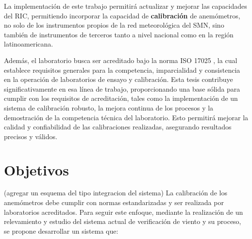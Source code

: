  La implementación de este trabajo permitirá actualizar y mejorar las capacidades del RIC, permitiendo incorporar la capacidad de \textbf{calibración} de anemómetros, no solo de los instrumentos propios de la red meteorológica del SMN, sino también de instrumentos de terceros tanto a nivel nacional como en la región latinoamericana. 

Además, el laboratorio busca ser acreditado bajo la norma ISO 17025 \cite{ISO17025}, la cual establece requisitos generales para la competencia, imparcialidad y consistencia en la operación de laboratorios de ensayo y calibración. Esta tesis contribuye significativamente en esa línea de trabajo, proporcionando una base sólida para cumplir con los requisitos de acreditación, tales como la implementación de un sistema de calibración robusto, la mejora continua de los procesos y la demostración de la competencia técnica del laboratorio. Esto permitirá mejorar la calidad y confiabilidad de las calibraciones realizadas, asegurando resultados precisos y válidos.

\section{Objetivos}\label{sec:objetivos}

(agregar un esquema del tipo integracion del sistema)
La calibración de los anemómetros debe cumplir con normas estandarizadas \cite{IEC61400-12-1} \cite{ISO16622} \cite{ISO17713-1} y ser realizada por laboratorios acreditados. Para seguir este enfoque, mediante la realización de un relevamiento y estudio del sistema actual de verificación de viento y su proceso, se propone desarrollar un sistema que:

